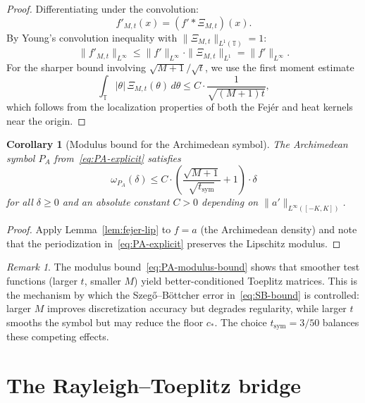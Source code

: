 \documentclass[11pt,a4paper]{article}
\newtheorem{corollary}[theorem]{Corollary}
\theoremstyle{definition}
\theoremstyle{remark}
\newtheorem{remark}[theorem]{Remark}
\newcommand{\T}{\mathbb{T}}
\begin{document}
\begin{proof}
Differentiating under the convolution:
\[
  f'_{M,t}(x) = (f' * \Xi_{M,t})(x).
\]
By Young's convolution inequality with $\|\Xi_{M,t}\|_{L^1(\T)} = 1$:
\[
  \|f'_{M,t}\|_{L^\infty} \leq \|f'\|_{L^\infty} \cdot \|\Xi_{M,t}\|_{L^1} = \|f'\|_{L^\infty}.
\]
For the sharper bound involving $\sqrt{M+1}/\sqrt{t}$, we use the first moment estimate
\[
  \int_{\T} |\theta| \, \Xi_{M,t}(\theta) \, d\theta \leq C \cdot \frac{1}{\sqrt{(M+1)t}},
\]
which follows from the localization properties of both the Fej\'er and heat kernels near the origin.
\end{proof}

\begin{corollary}[Modulus bound for the Archimedean symbol]\label{cor:PA-modulus}
The Archimedean symbol $P_A$ from~\eqref{eq:PA-explicit} satisfies
\begin{equation}\label{eq:PA-modulus-bound}
  \omega_{P_A}(\delta) \leq C \cdot \left( \frac{\sqrt{M+1}}{\sqrt{t_{\mathrm{sym}}}} + 1 \right) \cdot \delta
\end{equation}
for all $\delta \geq 0$ and an absolute constant $C > 0$ depending on $\|a'\|_{L^\infty([-K,K])}$.
\end{corollary}

\begin{proof}
Apply Lemma~\ref{lem:fejer-lip} to $f = a$ (the Archimedean density) and note that the periodization in~\eqref{eq:PA-explicit} preserves the Lipschitz modulus.
\end{proof}

\begin{remark}\label{rem:modulus-interpretation}
The modulus bound~\eqref{eq:PA-modulus-bound} shows that smoother test functions (larger $t$, smaller $M$) yield better-conditioned Toeplitz matrices. This is the mechanism by which the Szeg\H{o}--B\"ottcher error in~\eqref{eq:SB-bound} is controlled: larger $M$ improves discretization accuracy but degrades regularity, while larger $t$ smooths the symbol but may reduce the floor $c_*$. The choice $t_{\mathrm{sym}} = 3/50$ balances these competing effects.
\end{remark}

\section{The Rayleigh--Toeplitz bridge}\label{sec:bridge}
\end{document}
